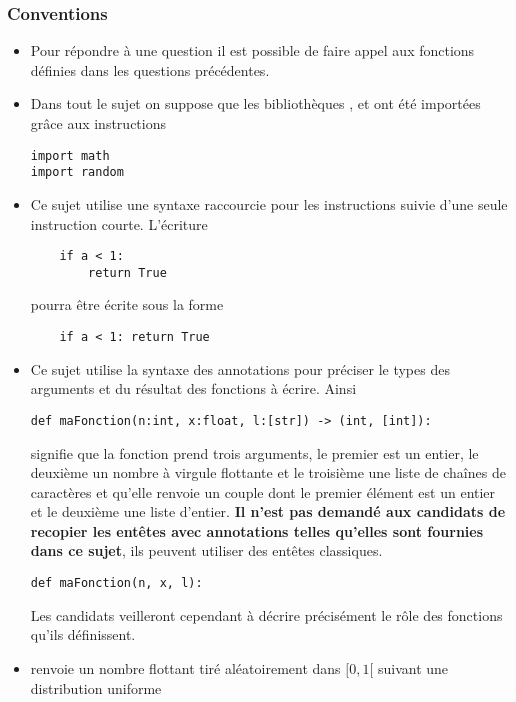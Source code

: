 \subsubsection{Conventions}
\begin{itemize}
    \item Pour répondre à une question il est possible de faire appel aux
fonctions définies dans les questions précédentes.
    \item Dans tout le sujet on suppose que les bibliothèques ,
 et  ont été importées grâce aux instructions
\begin{lstlisting}
import math
import random
\end{lstlisting}
\item Ce sujet utilise une syntaxe raccourcie pour les instructions  suivie d'une seule instruction courte. L'écriture
\begin{lstlisting}
    if a < 1:
        return True
\end{lstlisting}
pourra être écrite sous la forme
\begin{lstlisting}
    if a < 1: return True
\end{lstlisting}
\item Ce sujet utilise la syntaxe des annotations pour préciser le types des
arguments et du résultat des fonctions à écrire. Ainsi
\begin{lstlisting}
def maFonction(n:int, x:float, l:[str]) -> (int, [int]):
\end{lstlisting}
signifie que la fonction  prend trois arguments, le
premier est un entier, le deuxième un nombre à virgule flottante et le
troisième une liste de chaînes de caractères et qu'elle renvoie un
couple dont le premier élément est un entier et le deuxième une liste d'entier. 
{\bf Il n'est pas demandé aux candidats de recopier les entêtes avec
annotations telles qu'elles sont fournies dans ce sujet}, ils peuvent
utiliser des entêtes classiques. 
\begin{lstlisting}
def maFonction(n, x, l):
\end{lstlisting}
Les candidats veilleront cependant à décrire
précisément le rôle des fonctions qu'ils définissent.
\item {} renvoie un nombre flottant tiré aléatoirement
dans $\bigl[0,1\bigr[$ suivant une distribution uniforme
\end{itemize}
